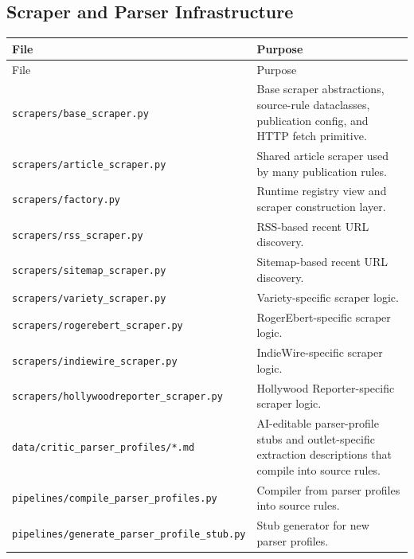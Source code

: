 \documentclass[11pt]{article}
\begin{document}
\subsection{Scraper and Parser Infrastructure}
\begin{longtable}{>{\ttfamily}p{}p{}}
\toprule
File & Purpose \\
\midrule
\endfirsthead
\toprule
File & Purpose \\
\midrule
\endhead
\textnormal{\texttt{scrapers/base\_scraper.py}} & Base scraper abstractions, source-rule dataclasses, publication config, and HTTP fetch primitive. \\
\textnormal{\texttt{scrapers/article\_scraper.py}} & Shared article scraper used by many publication rules. \\
\textnormal{\texttt{scrapers/factory.py}} & Runtime registry view and scraper construction layer. \\
\textnormal{\texttt{scrapers/rss\_scraper.py}} & RSS-based recent URL discovery. \\
\textnormal{\texttt{scrapers/sitemap\_scraper.py}} & Sitemap-based recent URL discovery. \\
\textnormal{\texttt{scrapers/variety\_scraper.py}} & Variety-specific scraper logic. \\
\textnormal{\texttt{scrapers/rogerebert\_scraper.py}} & RogerEbert-specific scraper logic. \\
\textnormal{\texttt{scrapers/indiewire\_scraper.py}} & IndieWire-specific scraper logic. \\
\textnormal{\texttt{scrapers/hollywoodreporter\_scraper.py}} & Hollywood Reporter-specific scraper logic. \\
\textnormal{\texttt{data/critic\_parser\_profiles/*.md}} & AI-editable parser-profile stubs and outlet-specific extraction descriptions that compile into source rules. \\
\textnormal{\texttt{pipelines/compile\_parser\_profiles.py}} & Compiler from parser profiles into source rules. \\
\textnormal{\texttt{pipelines/generate\_parser\_profile\_stub.py}} & Stub generator for new parser profiles. \\
\bottomrule
\end{longtable}
\end{document}
